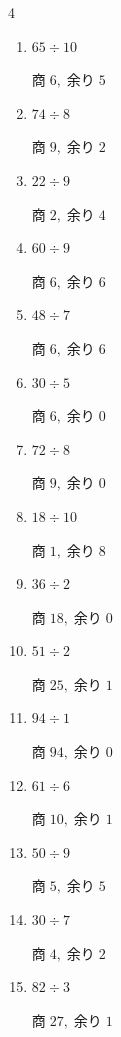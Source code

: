 \begin{multicols}{4}
\begin{enumerate}
  \item $65 \div 10$

        $商\; 6,\; 余り\; 5$

  \item $74 \div 8$

        $商\; 9,\; 余り\; 2$

  \item $22 \div 9$

        $商\; 2,\; 余り\; 4$

  \item $60 \div 9$

        $商\; 6,\; 余り\; 6$

  \item $48 \div 7$

        $商\; 6,\; 余り\; 6$

  \item $30 \div 5$

        $商\; 6,\; 余り\; 0$

\columnbreak %

  \item $72 \div 8$

        $商\; 9,\; 余り\; 0$

  \item $18 \div 10$

        $商\; 1,\; 余り\; 8$

  \item $36 \div 2$

        $商\; 18,\; 余り\; 0$

  \item $51 \div 2$

        $商\; 25,\; 余り\; 1$

  \item $94 \div 1$

        $商\; 94,\; 余り\; 0$

  \item $61 \div 6$

        $商\; 10,\; 余り\; 1$

  \item $50 \div 9$

        $商\; 5,\; 余り\; 5$

  \item $30 \div 7$

        $商\; 4,\; 余り\; 2$

  \item $82 \div 3$

        $商\; 27,\; 余り\; 1$


\end{enumerate}
\end{multicols}

